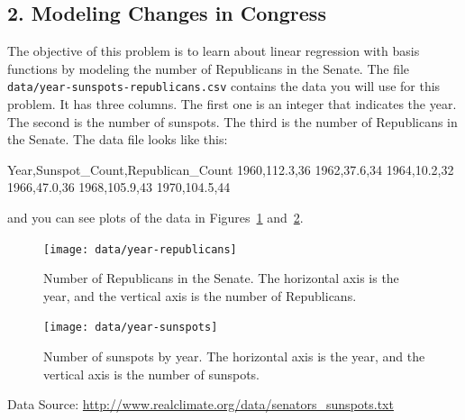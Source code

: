 \documentclass[submit]{harvardml}
\begin{document}
\newpage
\subsection*{2. Modeling Changes in Congress}
 The objective of this problem is to learn about linear regression
 with basis functions by modeling the number of Republicans in the
 Senate. The file \verb|data/year-sunspots-republicans.csv| contains the
 data you will use for this problem.  It has three columns.  The first
 one is an integer that indicates the year.  The second is the number
 of sunspots.  The third is the number of Republicans in the Senate.
 The data file looks like this:
 \begin{csv}
Year,Sunspot_Count,Republican_Count
1960,112.3,36
1962,37.6,34
1964,10.2,32
1966,47.0,36
1968,105.9,43
1970,104.5,44
\end{csv}
and you can see plots of the data in Figures~\ref{fig:congress}
and~\ref{fig:sunspots}. 

\begin{figure}[h]
\centering
\texttt{[image: data/year-republicans]}
\caption{Number of Republicans in the Senate.  The horizontal axis is the year, and the vertical axis is the number of Republicans.}
\label{fig:congress}
\end{figure}

\begin{figure}[h]
\centering
\texttt{[image: data/year-sunspots]}
\caption{Number of sunspots by year.  The horizontal axis is the year, and the vertical axis is the number of sunspots.}
\label{fig:sunspots}
\end{figure}

Data Source: \url{http://www.realclimate.org/data/senators_sunspots.txt}
\end{document}

